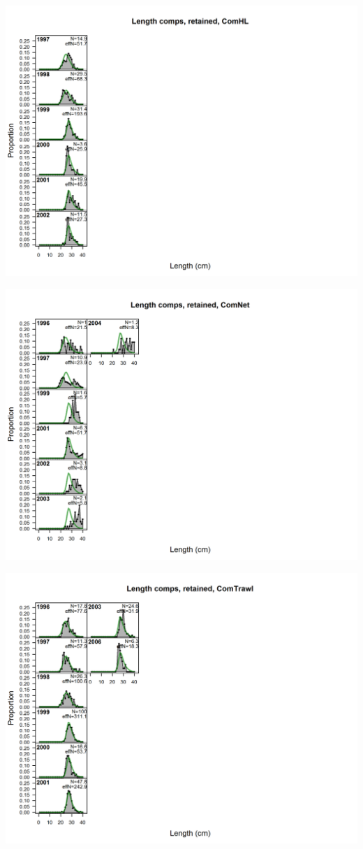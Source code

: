 \documentclass[ignorenonframetext,compress]{beamer}
\begin{document}
\renewcommand{\thepage}{A-\arabic{page}}
\renewcommand{\thefigure}{A\arabic{figure}}

\setcounter{page}{1}

\includegraphics{./r4ss/plots_mod1/comp_lenfit_flt1mkt2.png}

\includegraphics{./r4ss/plots_mod1/comp_lenfit_flt2mkt2.png}

\includegraphics{./r4ss/plots_mod1/comp_lenfit_flt3mkt2.png}
\end{document}
